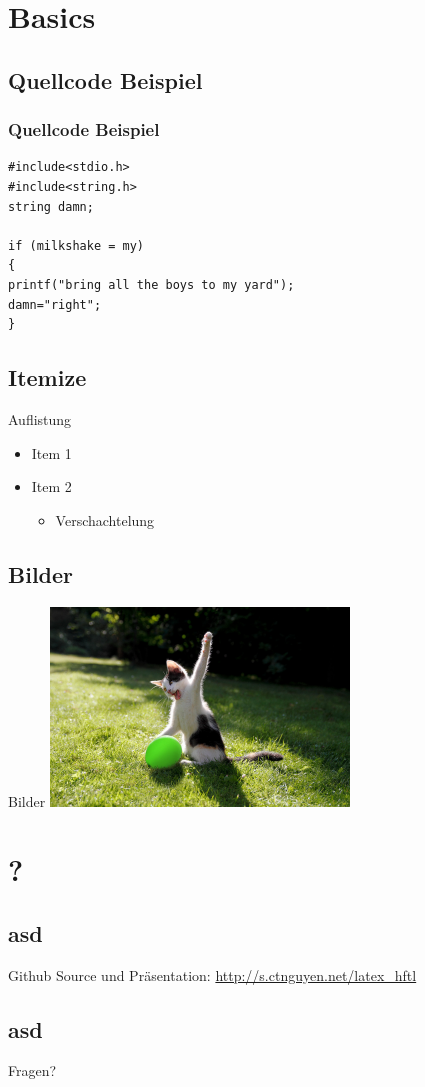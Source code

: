 \documentclass[xcolor=x11names,compress]{beamer} %
\renewcommand{\(}{\begin{columns}}
\renewcommand{\)}{\end{columns}}
\newcommand{\<}[1]{\begin{column}{#1}}
\renewcommand{\>}{\end{column}}
\begin{document}
\section{Basics}
	\subsection{Quellcode Beispiel}
	\begin{frame}[fragile]
	\frametitle{Quellcode Beispiel}
		\begin{lstlisting}
#include<stdio.h> 
#include<string.h>
string damn;

if (milkshake = my)
{
printf("bring all the boys to my yard");
damn="right";
}
		\end{lstlisting}
	\end{frame}	


	\subsection{Itemize}
		\begin{frame}{Auflistung}
			\begin{itemize}
				\item Item 1
				\pause
				\item Item 2
				\pause
					\begin{itemize}
						\item Verschachtelung
					\end{itemize}
			\end{itemize}
		\end{frame}

	\subsection{Bilder}
		\begin{frame}{Bilder}
			\includegraphics[width=300px]{images/IIctNxU.jpg}
		\end{frame}

\section{?}
	\subsection{asd}
		\begin{frame}
			Github Source und Präsentation:
			\href{http://s.ctnguyen.net/latex_hftl}{http://s.ctnguyen.net/latex\_hftl}
		\end{frame}

	\subsection{asd}
		\begin{frame}
			\huge{Fragen?}
		\end{frame}
\end{document}
